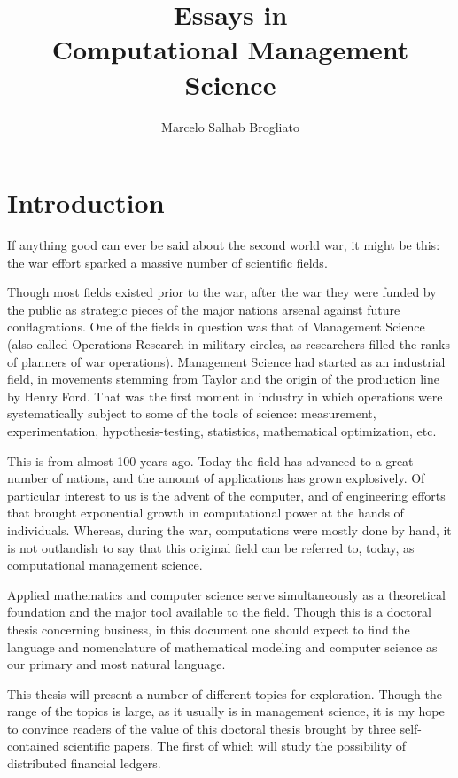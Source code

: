 \documentclass[12pt]{article}
\title{Essays in \\Computational Management Science}
\author{Marcelo Salhab Brogliato}
\begin{document}
\maketitle



\section{Introduction}

If anything good can ever be said about the second world war, it might be this: the war effort sparked a massive number of scientific fields.

Though most fields existed prior to the war, after the war they were funded by the public as strategic pieces of the major nations arsenal against future conflagrations. One of the fields in question was that of Management Science (also called Operations Research in military circles, as researchers filled the ranks of planners of war operations). Management Science had started as an industrial field, in movements stemming from Taylor and the origin of the production line by Henry Ford.  That was the first moment in industry in which operations were systematically subject to some of the tools of science: measurement, experimentation, hypothesis-testing, statistics, mathematical optimization, etc.

This is from almost 100 years ago. Today the field has advanced to a great number of nations, and the amount of applications has grown explosively.  Of particular interest to us is the advent of the computer, and of engineering efforts that brought exponential growth in computational power at the hands of individuals.  Whereas, during the war, computations were mostly done by hand, it is not outlandish to say that this original field can be referred to, today, as computational management science.

Applied mathematics and computer science serve simultaneously as a theoretical foundation and the major tool available to the field.  Though this is a doctoral thesis concerning business, in this document one should expect to find the language and nomenclature of mathematical modeling and computer science as our primary and most natural language.

This thesis will present a number of different topics for exploration. Though the range of the topics is large, as it usually is in management science, it is my hope to convince readers of the value of this doctoral thesis brought by three self-contained scientific papers.  The first of which will study the possibility of distributed financial ledgers.
\end{document}
